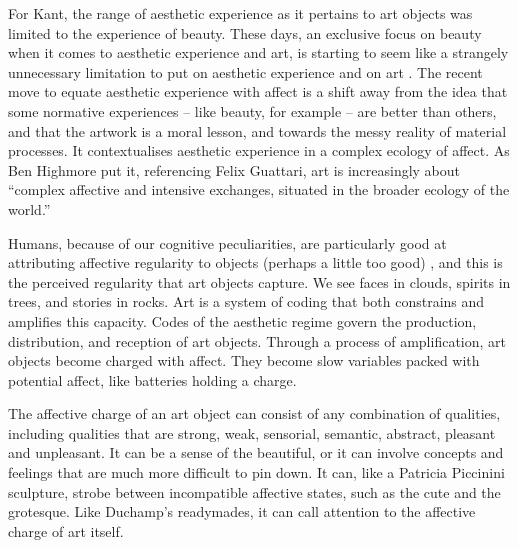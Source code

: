 \documentclass[letterpaper]{article}
\begin{document}
    For Kant, the range of aesthetic experience as it pertains to art objects was limited to the experience of beauty. These days, an exclusive focus on beauty when it comes to aesthetic experience and art, is starting to seem like a strangely unnecessary limitation to put on aesthetic experience and on art \citep[pp.121–122]{HighmoreBttrAftrTst2010}. The recent move to equate aesthetic experience with affect is a shift away from the idea that some normative experiences – like beauty, for example – are better than others, and that the artwork is a moral lesson, and towards the messy reality of material processes. It contextualises aesthetic experience in a complex ecology of affect. As Ben Highmore put it, referencing Felix Guattari, art is increasingly about “complex affective and intensive exchanges, situated in the broader ecology of the world.” \citep[p.155]{HighmoreBttrAftrTst2010}

    Humans, because of our cognitive peculiarities, are particularly good at attributing affective regularity to objects (perhaps a little too good) \citep{FristonThFrEnrgPrncpl2010} \citep{DeaconTheSymbolicSpecies1998}, and this is the perceived regularity that art objects capture. We see faces in clouds, spirits in trees, and stories in rocks. Art is a system of coding that both constrains and amplifies this capacity. Codes of the aesthetic regime govern the production, distribution, and reception of art objects. Through a process of amplification, art objects become charged with affect. They become slow variables packed with potential affect, like batteries holding a charge.

    The affective charge of an art object can consist of any combination of qualities, including qualities that are strong, weak, sensorial, semantic, abstract, pleasant and unpleasant. It can be a sense of the beautiful, or it can involve concepts and feelings that are much more difficult to pin down. It can, like a Patricia Piccinini sculpture, strobe between incompatible affective states, such as the cute and the grotesque. Like Duchamp's readymades, it can call attention to the affective charge of art itself.
\end{document}
